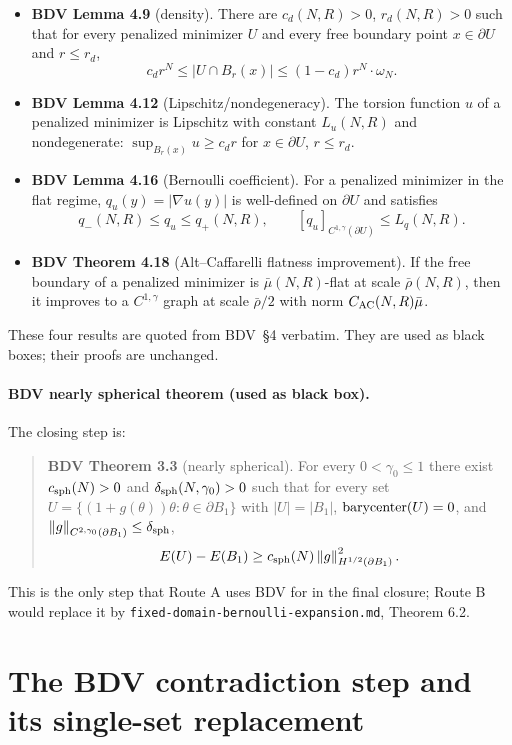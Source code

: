 \documentclass[11pt]{article}
\theoremstyle{definition}
\newcommand{\norm}[1]{\left\|#1\right\|}
\newcommand{\abs}[1]{\left|#1\right|}
\begin{document}
\begin{itemize}
\item \textbf{BDV Lemma 4.9} (density). There are
$c_d(N,R)>0$, $r_d(N,R)>0$ such that for every penalized minimizer $U$ and
every free boundary point $x\in\partial U$ and $r\le r_d$,
\[
c_d r^N\le\abs{U\cap B_r(x)}\le(1-c_d)r^N\cdot\omega_N.
\]

\item \textbf{BDV Lemma 4.12} (Lipschitz/nondegeneracy). The torsion
function $u$ of a penalized minimizer is Lipschitz with constant $L_u(N,R)$
and nondegenerate: $\sup_{B_r(x)}u\ge c_d r$ for $x\in\partial U$, $r\le r_d$.

\item \textbf{BDV Lemma 4.16} (Bernoulli coefficient). For a penalized
minimizer in the flat regime, $q_u(y)=\abs{\nabla u(y)}$ is well-defined on
$\partial U$ and satisfies
\[
q_-(N,R)\le q_u\le q_+(N,R),\qquad[q_u]_{C^{1,\gamma}(\partial U)}\le L_q(N,R).
\]

\item \textbf{BDV Theorem 4.18} (Alt--Caffarelli flatness improvement). If
the free boundary of a penalized minimizer is $\bar\mu(N,R)$-flat at scale
$\bar\rho(N,R)$, then it improves to a $C^{1,\gamma}$ graph at scale
$\bar\rho/2$ with norm $C_{\rm AC}(N,R)\bar\mu$.
\end{itemize}

These four results are quoted from BDV~\S 4 verbatim. They are used as
black boxes; their proofs are unchanged.

\paragraph{BDV nearly spherical theorem (used as black box).}
The closing step is:
\begin{quote}
\textbf{BDV Theorem 3.3} (nearly spherical). For every $0<\gamma_0\le1$
there exist $c_{\rm sph}(N)>0$ and $\delta_{\rm sph}(N,\gamma_0)>0$ such that for every set
$U=\{(1+g(\theta))\theta:\theta\in\partial B_1\}$ with
$\abs{U}=\abs{B_1}$, $\hbox{barycenter}(U)=0$, and
$\norm{g}_{C^{2,\gamma_0}(\partial B_1)}\le\delta_{\rm sph}$,
\[
E(U)-E(B_1)\ge c_{\rm sph}(N)\norm{g}_{H^{1/2}(\partial B_1)}^2.
\]
\end{quote}
This is the only step that Route A uses BDV for in the final closure; Route B
would replace it by \texttt{fixed-domain-bernoulli-expansion.md}, Theorem 6.2.

\section{The BDV contradiction step and its single-set replacement}
\end{document}
